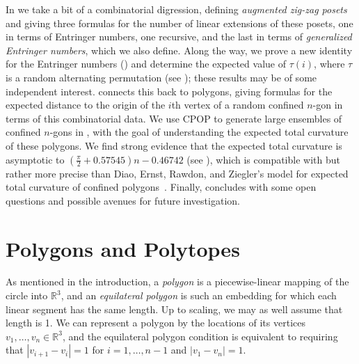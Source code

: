 \documentclass{article}
\theoremstyle{definition}
\newcommand{\R}{\mathbb{R}}
\begin{document}
In  we take a bit of a combinatorial digression, defining \emph{augmented zig-zag posets} and giving three formulas for the number of linear extensions of these posets, one in terms of Entringer numbers, one recursive, and the last in terms of \emph{generalized Entringer numbers}, which we also define. Along the way, we prove a new identity for the Entringer numbers () and determine the expected value of $\tau(i)$, where $\tau$ is a random alternating permutation (see ); these results may be of some independent interest.  connects this back to polygons, giving formulas for the expected distance to the origin of the $i$th vertex of a random confined $n$-gon in terms of this combinatorial data. We use CPOP to generate large ensembles of confined $n$-gons in , with the goal of understanding the expected total curvature of these polygons. We find strong evidence that the expected total curvature is asymptotic to $\left(\frac{\pi}{2} + 0.57545\right)n - 0.46742$ (see ), which is compatible with but rather more precise than Diao, Ernst, Rawdon, and Ziegler's model for expected total curvature of confined polygons~\cite{diaoTotalCurvatureTotal2018}. Finally,  concludes with some open questions and possible avenues for future investigation.























\section{Polygons and Polytopes}
\label{sec:polygons and polytopes}

As mentioned in the introduction, a \emph{polygon} is a piecewise-linear mapping of the circle into $\R^3$, and an \emph{equilateral polygon} is such an embedding for which each linear segment has the same length. Up to scaling, we may as well assume that length is 1. We can represent a polygon by the locations of its vertices $v_1, \dots , v_n \in \R^3$, and the equilateral polygon condition is equivalent to requiring that $|v_{i+1} - v_i| = 1$ for $i=1,\dots , n-1$ and $|v_1 - v_n| = 1$.
\end{document}
